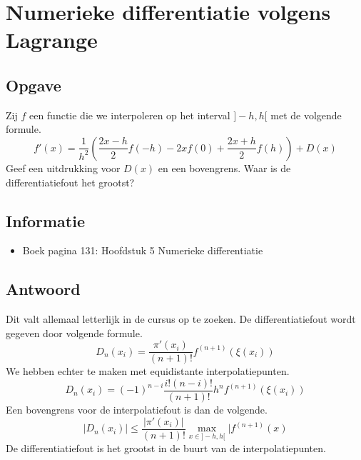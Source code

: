 \documentclass[examenvragen.tex]{subfiles}
\begin{document}
\section{Numerieke differentiatie volgens Lagrange}

\subsection{Opgave} 
Zij $f$ een functie die we interpoleren op het interval $]-h,h[$ met de volgende formule.
\[
f'(x) = \frac{1}{h^2}\left( \frac{2x-h}{2}f(-h) - 2xf(0) + \frac{2x+h}{2}f(h) \right) + D(x)
\]
Geef een uitdrukking voor $D(x)$ en een bovengrens. Waar is de differentiatiefout het grootst?

\subsection{Informatie}
\begin{itemize}
\item Boek pagina 131: Hoofdstuk 5 Numerieke differentiatie
\end{itemize}

\subsection{Antwoord}
Dit valt allemaal letterlijk in de cursus op te zoeken.
De differentiatiefout wordt gegeven door volgende formule.
\[
D_{n}(x_{i}) = \frac{\pi'(x_{i})}{(n+1)!}f^{(n+1)}(\xi(x_{i})) 
\]
We hebben echter te maken met equidistante interpolatiepunten.
\[
D_{n}(x_i) = (-1)^{n-i}\frac{i!(n-i)!}{(n+1)!}h^{n}f^{(n+1)}(\xi(x_i))
\]
Een bovengrens voor de interpolatiefout is dan de volgende.
\[
|D_{n}(x_i)| \le \frac{|\pi'(x_i)|}{(n+1)!}\max_{x\in]-h,h[}|f^{(n+1)}(x)
\]
De differentiatiefout is het grootst in de buurt van de interpolatiepunten.
\end{document}
